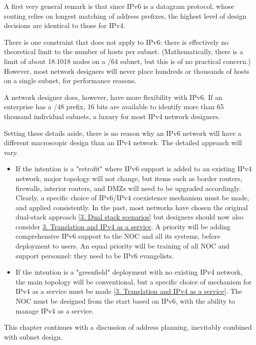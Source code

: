 \documentclass[
]{article}
\begin{document}
A first very general remark is that since IPv6 is a datagram protocol,
whose routing relies on longest matching of address prefixes, the
highest level of design decisions are identical to those for IPv4.

There is one constraint that does not apply to IPv6: there is
effectively no theoretical limit to the number of hosts per subnet.
(Mathematically, there is a limit of about 18.1018 nodes on a /64
subnet, but this is of no practical concern.) However, most network
designers will never place hundreds or thousands of hosts on a single
subnet, for performance reasons.

A network designer does, however, have more flexibility with IPv6. If an
enterprise has a /48 prefix, 16 bits are available to identify more than
65 thousand individual subnets, a luxury for most IPv4 network
designers.

Setting these details aside, there is no reason why an IPv6 network will
have a different macroscopic design than an IPv4 network. The detailed
approach will vary.

\begin{itemize}
\item
  If the intention is a "retrofit" where IPv6 support is added to an
  existing IPv4 network, major topology will not change, but items such
  as border routers, firewalls, interior routers, and DMZs will need to
  be upgraded accordingly. Clearly, a specific choice of IPv6/IPv4
  coexistence mechanism must be made, and applied consistently. In the
  past, most networks have chosen the original dual-stack approach
  {[}\hyperref[dual-stack-scenarios]{3. Dual stack scenarios}{]} but
  designers should now also consider
  \hyperref[translation-and-ipv4-as-a-service]{3. Translation and IPv4
  as a service}. A priority will be adding comprehensive IPv6 support to
  the NOC and all its systems, before deployment to users. An equal
  priority will be training of all NOC and support personnel: they need
  to be IPv6 evangelists.
\item
  If the intention is a "greenfield" deployment with no existing IPv4
  network, the main topology will be conventional, but a specific choice
  of mechanism for IPv4 as a service must be made
  {[}\hyperref[translation-and-ipv4-as-a-service]{3. Translation and
  IPv4 as a service}{]}. The NOC must be designed from the start based
  on IPv6, with the ability to manage IPv4 as a service.
\end{itemize}

This chapter continues with a discussion of address planning, inevitably
combined with subnet design.
\end{document}
